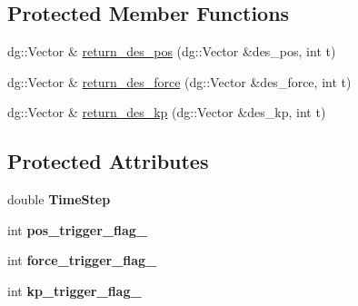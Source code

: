 \subsection*{Protected Member Functions}
\begin{DoxyCompactItemize}
\item 
dg\+::\+Vector \& \hyperlink{classdynamicgraph_1_1sot_1_1PowerJumpControl_ad132ac991b6fb6cddd9aa019a33425e9}{return\+\_\+des\+\_\+pos} (dg\+::\+Vector \&des\+\_\+pos, int t)
\item 
dg\+::\+Vector \& \hyperlink{classdynamicgraph_1_1sot_1_1PowerJumpControl_a0172cfef3c8c11b441fee7380c69c227}{return\+\_\+des\+\_\+force} (dg\+::\+Vector \&des\+\_\+force, int t)
\item 
dg\+::\+Vector \& \hyperlink{classdynamicgraph_1_1sot_1_1PowerJumpControl_aa00816d8369775112bcb93b915790926}{return\+\_\+des\+\_\+kp} (dg\+::\+Vector \&des\+\_\+kp, int t)
\end{DoxyCompactItemize}
\subsection*{Protected Attributes}
\begin{DoxyCompactItemize}
\item 
double {\bfseries Time\+Step}\hypertarget{classdynamicgraph_1_1sot_1_1PowerJumpControl_a791dadb09401879a56034869b0b3b9be}{}\label{classdynamicgraph_1_1sot_1_1PowerJumpControl_a791dadb09401879a56034869b0b3b9be}

\item 
int {\bfseries pos\+\_\+trigger\+\_\+flag\+\_\+}\hypertarget{classdynamicgraph_1_1sot_1_1PowerJumpControl_aba54ff31f75ea7b32e735dde24061093}{}\label{classdynamicgraph_1_1sot_1_1PowerJumpControl_aba54ff31f75ea7b32e735dde24061093}

\item 
int {\bfseries force\+\_\+trigger\+\_\+flag\+\_\+}\hypertarget{classdynamicgraph_1_1sot_1_1PowerJumpControl_a86e8dc105cf169265bc1b183c7187e55}{}\label{classdynamicgraph_1_1sot_1_1PowerJumpControl_a86e8dc105cf169265bc1b183c7187e55}

\item 
int {\bfseries kp\+\_\+trigger\+\_\+flag\+\_\+}\hypertarget{classdynamicgraph_1_1sot_1_1PowerJumpControl_a55f86a204909e655a1f3a8deff024770}{}\label{classdynamicgraph_1_1sot_1_1PowerJumpControl_a55f86a204909e655a1f3a8deff024770}

\end{DoxyCompactItemize}


